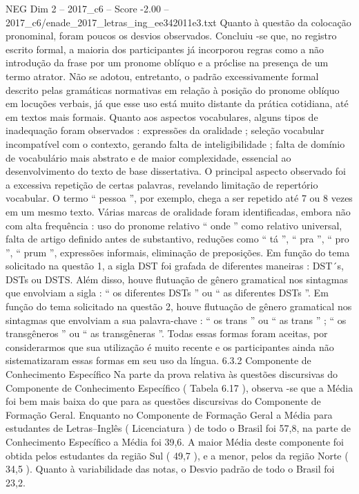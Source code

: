 \begin{textsample}{NEG Dim 2 – 2017\_c6 – Score -2.00 – 2017\_c6/enade\_2017\_letras\_ing\_ee342011e3.txt}
Quanto à questão da colocação pronominal, foram poucos os desvios observados.
Concluiu -se que, no registro escrito formal, a maioria dos participantes já incorporou regras como a não introdução da frase por um pronome oblíquo e a próclise na presença de um termo atrator.
Não se adotou, entretanto, o padrão excessivamente formal descrito pelas gramáticas normativas em relação à posição do pronome oblíquo em locuções verbais, já que esse uso está muito distante da prática cotidiana, até em textos mais formais.
Quanto aos aspectos vocabulares, alguns tipos de inadequação foram observados : expressões da oralidade ; seleção vocabular incompatível com o contexto, gerando falta de inteligibilidade ; falta de domínio de vocabulário mais abstrato e de maior complexidade, essencial ao desenvolvimento do texto de base dissertativa.
O principal aspecto observado foi a excessiva repetição de certas palavras, revelando limitação de repertório vocabular.
O termo “ pessoa ”, por exemplo, chega a ser repetido até 7 ou 8 vezes em um mesmo texto.
Várias marcas de oralidade foram identificadas, embora não com alta frequência : uso do pronome relativo “ onde ” como relativo universal, falta de artigo definido antes de substantivo, reduções como “ tá ”, “ pra ”, “ pro ”, “ prum ”, expressões informais, eliminação de preposições.
Em função do tema solicitado na questão 1, a sigla DST foi grafada de diferentes maneiras : DST´s, DSTs ou DSTS.
Além disso, houve flutuação de gênero gramatical nos sintagmas que envolviam a sigla : “ os diferentes DSTs ” ou “ as diferentes DSTs ”.
Em função do tema solicitado na questão 2, houve flutuação de gênero gramatical nos sintagmas que envolviam a sua palavra-chave : “ os trans ” ou “ as trans ” ; “ os transgêneros ” ou “ as transgêneras ”.
Todas essas formas foram aceitas, por considerarmos que sua utilização é muito recente e os participantes ainda não sistematizaram essas formas em seu uso da língua. 6.3.2 Componente de Conhecimento Específico Na parte da prova relativa às questões discursivas do Componente de Conhecimento Específico ( Tabela 6.17 ), observa -se que a Média foi bem mais baixa do que para as questões discursivas do Componente de Formação Geral.
Enquanto no Componente de Formação Geral a Média para estudantes de Letras–Inglês ( Licenciatura ) de todo o Brasil foi 57,8, na parte de Conhecimento Específico a Média foi 39,6.
A maior Média deste componente foi obtida pelos estudantes da região Sul ( 49,7 ), e a menor, pelos da região Norte ( 34,5 ).
Quanto à variabilidade das notas, o Desvio padrão de todo o Brasil foi 23,2.

\end{textsample}
